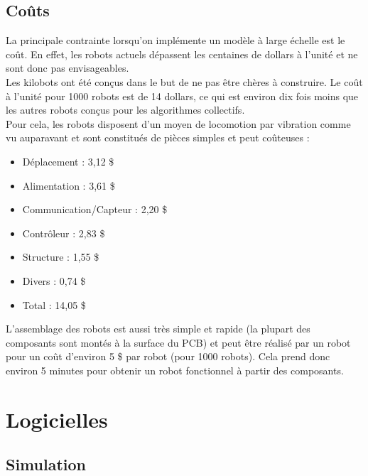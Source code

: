 \documentclass[a4paper,8pt]{report}
\begin{document}
\subsection*{Co\^uts}\label{subsec:name}

La principale contrainte lorsqu'on impl\'emente un mod\`ele \`a large \'echelle est le co\^ut. En effet, les robots actuels d\'epassent les centaines de dollars \`a l'unit\'e et ne sont donc pas envisageables. \\
Les kilobots ont \'et\'e con\c cus dans le but de ne pas \^etre ch\`eres \`a construire. Le co\^ut \`a l'unit\'e pour 1000 robots est de 14 dollars, ce qui est environ dix fois moins que les autres robots con\c cus pour les algorithmes collectifs. \\
Pour cela, les robots disposent d'un moyen de locomotion par vibration comme vu auparavant et sont constitu\'es de pi\`eces simples et peut co\^uteuses : \\

\begin{itemize}
\item D\'eplacement : 3,12 \$
\item Alimentation : 3,61 \$
\item Communication/Capteur : 2,20 \$
\item Contr\^oleur : 2,83 \$
\item Structure : 1,55 \$
\item Divers : 0,74 \$
\item Total : 14,05 \$
\end{itemize}

\medskip
L'assemblage des robots est aussi tr\`es simple et rapide (la plupart des composants sont mont\'es \`a la  surface du PCB) et peut \^etre r\'ealis\'e par un robot pour un co\^ut d'environ 5 \$ par robot (pour 1000 robots). Cela prend donc environ 5 minutes pour obtenir un robot fonctionnel \`a partir des composants.\\

\section*{Logicielles}\label{sec:name}

\subsection*{Simulation}\label{subsec:name}
\end{document}
